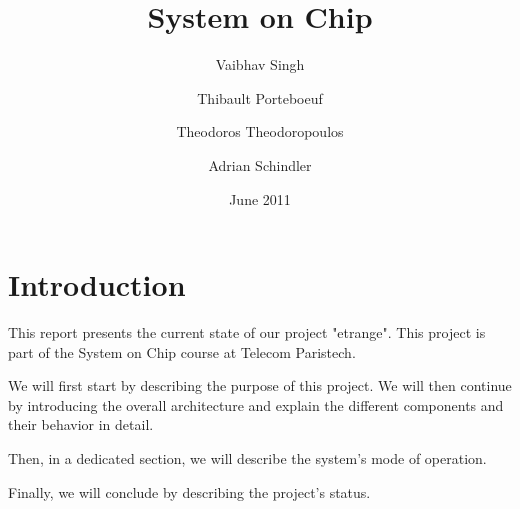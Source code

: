\documentclass[a4paper,10pt]{article}
\begin{document}
\title{System on Chip}

\author{Vaibhav Singh \and Thibault Porteboeuf \and Theodoros
Theodoropoulos \and Adrian Schindler}

\date{June 2011}
\maketitle

\tableofcontents

\section{Introduction} 

This report presents the current state of our project "etrange". This project is part of the System on Chip course at Telecom Paristech.

We will first start by describing the purpose of this project. We will then continue by introducing the overall architecture and explain the different components and their behavior in detail.

Then, in a dedicated section, we will describe the system's mode of operation.

Finally, we will conclude by describing the project's status.







\end{document}
